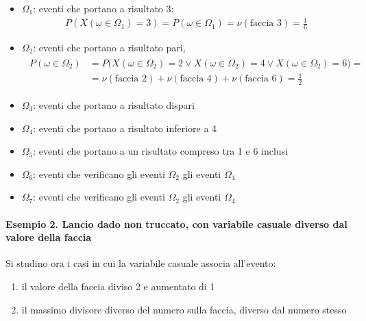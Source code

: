 \documentclass[letterpaper,10pt,italian]{jupyterBook}
\begin{document}
\begin{itemize}
\item {} 
\sphinxAtStartPar
\(\Omega_1\): eventi che portano a risultato 3:
\begin{equation*}
\begin{split}P(X(\omega \in \Omega_1) = 3) = P(\omega \in \Omega_1) = \nu(\text{faccia 3}) = \frac{1}{6}\end{split}
\end{equation*}
\item {} 
\sphinxAtStartPar
\(\Omega_2\): eventi che portano a risultato pari,
\begin{equation*}
\begin{split}\begin{aligned}
    P(\omega \in \Omega_2) 
    & = P\big(X(\omega \in \Omega_2) = 2 \lor X(\omega \in \Omega_2) = 4 \lor X(\omega \in \Omega_2) = 6\big) = \\
    & = \nu(\text{faccia 2}) + \nu(\text{faccia 4}) + \nu(\text{faccia 6}) = \frac{1}{2}
  \end{aligned}\end{split}
\end{equation*}
\item {} 
\sphinxAtStartPar
\(\Omega_3\): eventi che portano a risultato dispari

\item {} 
\sphinxAtStartPar
\(\Omega_4\): eventi che portano a risultato inferiore a 4

\item {} 
\sphinxAtStartPar
\(\Omega_5\): eventi che portano a un risultato compreso tra 1 e 6 inclusi

\item {} 
\sphinxAtStartPar
\(\Omega_6\): eventi che verificano gli eventi \(\Omega_2\)  gli eventi \(\Omega_4\)

\item {} 
\sphinxAtStartPar
\(\Omega_7\): eventi che verificano gli eventi \(\Omega_2\)  gli eventi \(\Omega_4\)

\end{itemize}


\paragraph{Esempio 2. Lancio dado non truccato, con variabile casuale diverso dal valore della faccia}
\label{\detokenize{ch/statistics/random_variables_definition:esempio-2-lancio-dado-non-truccato-con-variabile-casuale-diverso-dal-valore-della-faccia}}
\sphinxAtStartPar
Si studino ora i casi in cui la variabile casuale associa all’evento:
\begin{enumerate}
%
\item {} 
\sphinxAtStartPar
il valore della faccia diviso 2 e aumentato di 1

\item {} 
\sphinxAtStartPar
il massimo divisore diverso del numero sulla faccia, diverso dal numero stesso

\end{enumerate}
\end{document}
